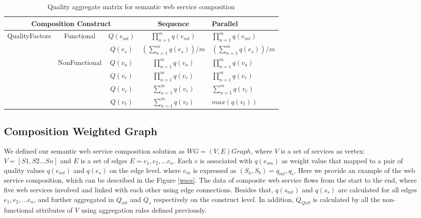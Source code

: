 \documentclass{llncs}
\begin{document}
\begin{table}[]
\centering
\caption{Quality aggregate matrix for semantic web service composition}
\label{table1}
\begin{tabular}{|c|c|c|c|l|}
\hline
\multicolumn{3}{|c|}{Composition Construct}                                      & Sequence                             & Parallel \\ \hline
\multirow{5}{*}{QualityFactors} & \multirow{2}{*}{Functional}    & $Q(e_ {mt})$  &$\prod_{n=1}^{m} q(e_ {mt})$          &  $\prod_{n=1}^{m} q(e_ {mt})$ \\ \cline{3-5}
                                &                                & $Q(e_ {s})$  & $(\sum_{n=1}^m q(e_ {s}))/m$        &  $(\sum_{n=1}^m q(e_ {s}))/m$  \\ \cline{2-5}   
                                & \multirow{4}{*}{NonFunctional} & $Q(v_{a})$    & $\prod_{n=1}^{m} q(v_a)$             &  $\prod_{n=1}^{m} q(v_a)$ \\ \cline{3-5} 
                                &                                & $Q(v_{r})$    & $\prod_{n=1}^{m} q(v_r)$             &  $\prod_{n=1}^{m} q(v_r)$ \\ \cline{3-5} 
                                &                                & $Q(v_{c})$    & $\sum_{n=1}^m q(v_ {c})$             &  $\sum_{n=1}^m q(v_ {c})$ \\ \cline{3-5} 
                                &                                & $Q(v_{t})$    & $\sum_{n=1}^m q(v_ {t})$             &  $max(q(v_ {t}))$ \\ \hline
\end{tabular}
\end{table}



\subsection{Composition Weighted Graph}
We defined our semantic web service composition solution as $WG = (V, E)Graph$, where $V$ is a set of services as vertex: $V=[S1, S2...Sn]$ and $E$ is a set of edges $E = {e_{1}, e_{2},... e_{n}}$. Each $e$ is associated with $q(e_{sm})$ as weight value that mapped to a pair of quality values $q(e_{mt})$ and $q(e_{s})$ on the edge level. where $e_{m}$ is expressed as $(S_{a},S_{b})={q_{mt}, q_{s}}$. Here we provide an example of the web service composition, which can be described in the Figure \ref{wscs}. The data of composite web service flows from the start to the end, where five web services involved and linked with each other using edge connections. Besides that, $q(s_{mt})$ and $q(s_{s})$ are calculated for all edges ${e_{1}, e_{2},... e_{n}}$, and further aggregated in $Q_{mt}$ and $Q_{s}$ respectively on the construct level. In addition, $Q_{QoS}$ is calculated by all the non-functional attributes of $V$ using aggregation rules defined previously.
\end{document}
